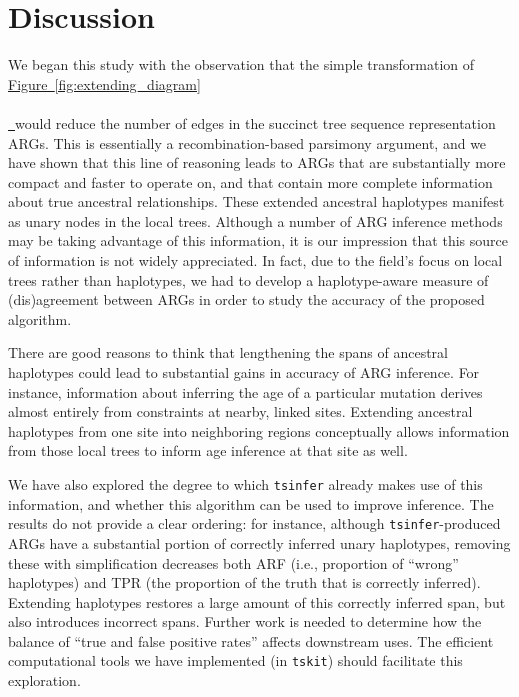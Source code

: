 \documentclass[10pt,twoside,lineno]{gsajnl}
\newcommand{\tskit}{\texttt{tskit}}
\newcommand{\tsinfer}{\texttt{tsinfer}}
\newcommand*{\figref}[2][]{%
	\hyperref[{#2}]{%
		Figure~\ref*{#2}%
		\ifx\\#1\\%
		\else
		\,#1%
		\fi
	}%
}
\begin{document}
\section{Discussion}

We began this study with the observation that the simple transformation
of \figref{fig:extending_diagram} would reduce the number of edges
in the succinct tree sequence representation ARGs.
This is essentially a recombination-based parsimony argument,
and we have shown that this line of reasoning
leads to ARGs that are substantially more compact and faster to operate on,
and that contain more complete information about true ancestral relationships.
These extended ancestral haplotypes manifest as unary nodes in the local trees.
Although a number of ARG inference methods may be taking advantage of this information,
it is our impression that this source of information is not widely appreciated.
In fact, due to the field's focus on local trees rather than haplotypes,
we had to develop a haplotype-aware measure of (dis)agreement between ARGs in order to study the accuracy of the proposed algorithm.

There are good reasons to think that lengthening the spans of ancestral haplotypes
could lead to substantial gains in accuracy of ARG inference.
For instance, information about inferring the age of a particular mutation
derives almost entirely from constraints at nearby, linked sites.
Extending ancestral haplotypes from one site into neighboring regions
conceptually allows information from those local trees
to inform age inference at that site as well.

We have also explored the degree to which \tsinfer{} already makes use of this information,
and whether this algorithm can be used to improve inference.
The results do not provide a clear ordering:
for instance, although \tsinfer-produced ARGs
have a substantial portion of correctly inferred unary haplotypes,
removing these with simplification decreases both ARF
(i.e., proportion of ``wrong'' haplotypes)
and TPR (the proportion of the truth that is correctly inferred).
Extending haplotypes restores a large amount of this correctly inferred span,
but also introduces incorrect spans.
Further work is needed to determine how the balance of ``true and false positive rates''
affects downstream uses.
The efficient computational tools we have implemented (in \tskit{})
should facilitate this exploration.
\end{document}
